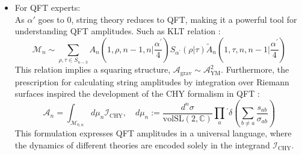 \documentclass{beamer}
\begin{document}
\begin{frame}
\begin{itemize}
\item {\color{WHU} For QFT experts:}\\
	As $\alpha'$ goes to $0$, string theory reduces to QFT, making it a powerful tool for understanding QFT amplitudes. Such as KLT relation \cite{Kawai:1985xq}:
	\begin{equation*}
		\mathcal{M}_n\sim\sum_{\rho,\tau\in S_{n-3}}A_n\left(1,\rho,n-1,n|\frac{\alpha^{\prime}}{4}\right)S_{\alpha^{\prime}}(\rho|\tau)\tilde{A}_n\left(1,\tau,n,n-1|\frac{\alpha^{\prime}}{4}\right)
	\end{equation*}
	This relation implies a squaring structure, $\mathcal{A}_{\text{grav}}\sim \mathcal{A}_{\text{YM}}^2$. Furthermore, the prescription for calculating string amplitudes by integration over Riemann surfaces inspired the development of the CHY formalism in QFT \cite{Cachazo:2013iea,Cachazo:2013hca}:
	\begin{equation*}
		\mathcal{A}_n = \int_{\mathcal{M}_{0,n}} d\mu_n \mathcal{I}_\text{CHY},\quad d\mu_n:=\frac{d^n\sigma}{\mathrm{volSL}(2,\mathbb{C})}\prod_a{^{\prime}\delta}{\left(\sum_{b\neq a}\frac{s_{ab}}{\sigma_{ab}}\right)}
	\end{equation*}
	This formulation expresses QFT amplitudes in a universal language, where the dynamics of different theories are encoded solely in the integrand $\mathcal{I}_{\text{CHY}}$.
\end{itemize}
\end{frame}
\end{document}
